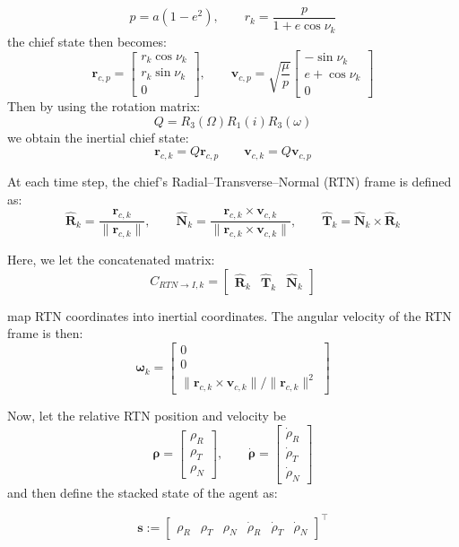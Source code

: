 \[
p = a(1-e^2),
\qquad
r_k = \frac{p}{1+e\cos\nu_k}
\]
the chief state then becomes:
\[
\mathbf{r}_{c,p}
=
\begin{bmatrix}
r_k\cos\nu_k\\
r_k\sin\nu_k\\
0
\end{bmatrix},
\qquad
\mathbf{v}_{c,p}
=
\sqrt{\frac{\mu}{p}}
\begin{bmatrix}
-\sin\nu_k\\
e+\cos\nu_k\\
0
\end{bmatrix}
\]
Then by using the rotation matrix:
\[
Q = R_3(\Omega)R_1(i)R_3(\omega)
\]
we obtain the inertial chief state:
\[
\mathbf{r}_{c,k} = Q\mathbf{r}_{c,p}
\qquad
\mathbf{v}_{c,k} = Q\mathbf{v}_{c,p}
\]

At each time step, the chief's Radial--Transverse--Normal (RTN) frame is defined as:
\[
\hat{\mathbf{R}}_k = \frac{\mathbf{r}_{c,k}}{\|\mathbf{r}_{c,k}\|},
\qquad
\hat{\mathbf{N}}_k =
\frac{\mathbf{r}_{c,k}\times \mathbf{v}_{c,k}}
     {\|\mathbf{r}_{c,k}\times \mathbf{v}_{c,k}\|},
\qquad
\hat{\mathbf{T}}_k = \hat{\mathbf{N}}_k \times \hat{\mathbf{R}}_k
\]

Here, we let the concatenated matrix:
\[
C_{RTN\to I,k}
=
\begin{bmatrix}
\hat{\mathbf{R}}_k & \hat{\mathbf{T}}_k & \hat{\mathbf{N}}_k
\end{bmatrix}
\]

map RTN coordinates into inertial coordinates. The angular velocity of the RTN frame is then:
\[
\boldsymbol{\omega}_k =
\begin{bmatrix}
0\\
0\\
\|\mathbf{r}_{c,k}\times \mathbf{v}_{c,k}\|/\|\mathbf{r}_{c,k}\|^2
\end{bmatrix}
\]

Now, let the relative RTN position and velocity be
\[
\boldsymbol{\rho} =
\begin{bmatrix}
\rho_R\\
\rho_T\\
\rho_N
\end{bmatrix},
\qquad
\dot{\boldsymbol{\rho}} =
\begin{bmatrix}
\dot{\rho}_R\\
\dot{\rho}_T\\
\dot{\rho}_N
\end{bmatrix}
\]
and then define the stacked state of the agent as:

\[
\mathbf{s} :=
\begin{bmatrix}
\rho_R &
\rho_T &
\rho_N &
\dot{\rho}_R &
\dot{\rho}_T &
\dot{\rho}_N
\end{bmatrix}^{\top}
\]

